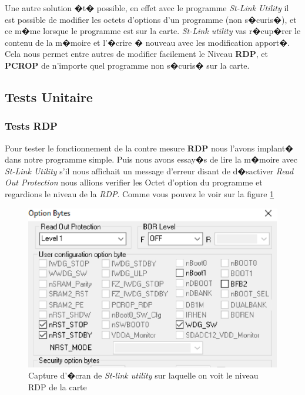 \documentclass[a4paper, titlepage,12pt]{report}
\begin{document}
Une autre solution �t� possible, en effet avec le programme \textit{St-Link Utility} il est possible de modifier les octets d'options d'un programme (non s�curis�), et ce m�me lorsque le programme est sur la carte. 
\textit{St-Link utility} vas r�cup�rer le contenu de la m�moire et l'�crire � nouveau avec les modification apport�. Cela nous permet entre autres de modifier facilement le Niveau \textbf{RDP}, et \textbf{PCROP} de n'importe quel programme non s�curis� sur la carte.

\subsection{Tests Unitaire}
\paragraph{}
\subsubsection{Tests RDP}
Pour tester le fonctionnement de la contre mesure \textbf{RDP} nous l'avons implant� dans notre programme simple. Puis nous avons essay�s de lire la m�moire avec \textit{St-Link Utility} s'il nous affichait un message d'erreur disant de d�sactiver \textit{Read Out Protection} nous allions verifier les Octet d'option du programme et regardions le niveau de la \textit{RDP}. Comme vous pouvez le voir sur la figure \ref{OptionByteWindows}

\begin{figure}[!h]
\centering
\includegraphics[scale=0.6]{img/eps/OptionByteWindows.eps}
\caption{Capture d'�cran de \textit{St-link utility} sur laquelle on voit le niveau RDP de la carte}
\label{OptionByteWindows}
\end{figure}
\end{document}

